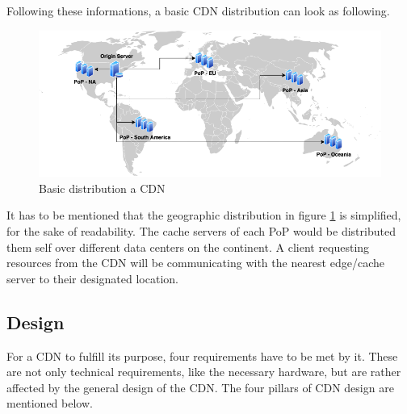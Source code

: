 Following these informations, a basic CDN distribution can look as following.

\begin{figure}[!h]
	\centering
	\includegraphics[width=1\textwidth]{Figures/basic_cdn_arch.drawio.png}
	\caption{Basic distribution a CDN}
	\label{fig:cdn_general_arch}
\end{figure}

It has to be mentioned that the geographic distribution in figure \ref{fig:cdn_general_arch} is simplified, for the sake of readability. The cache servers of each PoP would be distributed them self over different data centers on the continent. A client requesting resources from the CDN will be communicating with the nearest edge/cache server to their designated location.\cite{cdn_general}

\subsection{Design}

For a CDN to fulfill its purpose, four requirements have to be met by it. These are not only technical requirements, like the necessary hardware, but are rather affected by the general design of the CDN.
The four pillars of CDN design are mentioned below.

